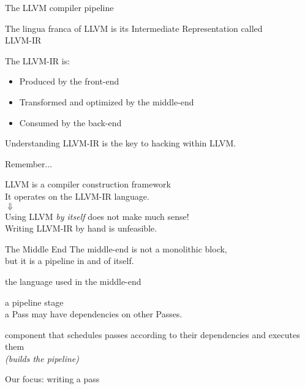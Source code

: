 \begin{frame}{The LLVM compiler pipeline}
\begin{center}
The lingua franca of LLVM is its \alert{Intermediate Representation} called\\
\medskip
{\large LLVM-IR}\\
\end{center}
\bigskip
The LLVM-IR is:
\begin{itemize}
\item \alert{Produced} by the \alert{front-end}
\item \alert{Transformed and optimized} by the \alert{middle-end}
\item \alert{Consumed} by the \alert{back-end}
\end{itemize}
\bigskip
Understanding LLVM-IR is the key to hacking within LLVM.
\end{frame}


\begin{frame}{Remember...}
\begin{center}
LLVM is a \alert{compiler construction framework}\\
It operates on the \alert{LLVM-IR} language.\\
\bigskip
$\Downarrow$\\
\bigskip
Using LLVM \emph{by itself} does not make much sense!\\
Writing LLVM-IR by hand is unfeasible.
\end{center}
\end{frame}


\begin{frame}{The Middle End}
\centering
The middle-end is not a monolithic block,\\but it is a pipeline in and of itself.\\
\raggedright
\bigskip
\begin{description}
\item[LLVM-IR] the \alert{language} used in the middle-end
\item[Pass] a \alert{pipeline stage}\\
a Pass may have \alert{dependencies} on other Passes.
\item[Pass Manager] component that \alert{schedules} passes according to their \alert{dependencies} and \alert{executes} them\\
\emph{(builds the pipeline)}
\end{description}
\bigskip\centering
Our focus: \alert{writing a pass}
\end{frame}



